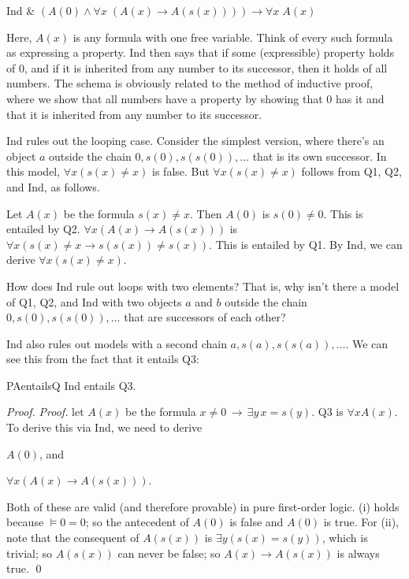 \begin{axioms}
  Ind & $(A(0) \land \forall x\; (A(x) \rightarrow A(s(x)))) \to \forall x\; A(x)$
\end{axioms}

Here, $A(x)$ is any formula with one free variable.
Think of every such formula as expressing a property.
Ind then says that
if some (expressible) property holds of 0,
and if it is inherited from any number to its successor,
then it holds of all numbers.
The schema is obviously related to the method of inductive proof,
where we show that
all numbers have a property
by showing that 0 has it and that it is inherited from any number to its successor.

Ind rules out the looping case.
Consider the simplest version,
where there's an object $a$ outside the chain $0, s(0), s(s(0)), \ldots$
that is its own successor.
In this model,
$\forall x (s(x) \ne x)$ is false.
But $\forall x (s(x) \ne x)$ follows from Q1, Q2, and Ind,
as follows.

Let $A(x)$ be the formula $s(x) \ne x$.
Then $A(0)$ is $s(0) \ne 0$.
This is entailed by Q2.
$\forall x (A(x) \to A(s(x)))$ is $\forall x (s(x) \ne x \to s(s(x)) \ne s(x))$.
This is entailed by Q1.
By Ind,
we can derive $\forall x {(s(x) \ne x)}$.

\begin{exercise}
  How does Ind rule out loops with two elements?
  That is,
  why isn't there a model of Q1, Q2, and Ind with two objects $a$ and $b$
  outside the chain $0, s(0), s(s(0)), \ldots$ that are successors of each other?
\end{exercise}

Ind also rules out models with a second chain $a, s(a), s(s(a)), \ldots$.
We can see this from the fact that it entails Q3:

\begin{proposition}{}{PAentailsQ}
  Ind entails Q3.
\end{proposition}
\begin{proof}
   \emph{Proof.}
    let $A(x)$ be the formula $x\!\not= 0 \,\to\, \exists y\, x\!=\!s(y)$.
    Q3 is $\forall x A(x)$.
    To derive this via Ind,
    we need to derive
    \begin{cenumerate}
    \item[(i)] $A(0)$, and
    \item[(ii)] $\forall x (A(x) \to A(s(x)))$.
    \end{cenumerate}
    Both of these are valid (and therefore provable) in pure first-order logic.
    (i) holds because $\models 0 = 0$;
    so the antecedent of $A(0)$ is false and $A(0)$ is true.
    For (ii),
    note that the consequent of $A(s(x))$ is $\exists y (s(x) = s(y))$,
    which is trivial;
    so $A(s(x))$ can never be false;
    so $A(x) \to A(s(x))$ is always true.
    \qed
\end{proof}

